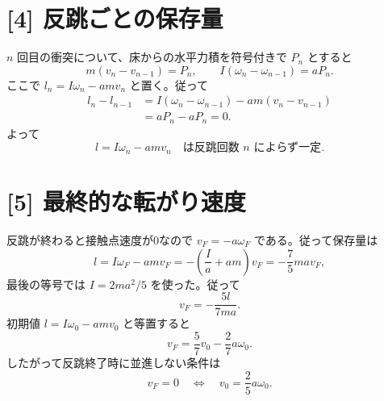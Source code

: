 \documentclass[11pt,a4paper]{article}
\begin{document}
\section*{[4] 反跳ごとの保存量}
$n$ 回目の衝突について、床からの水平力積を符号付きで $P_n$ とすると
\begin{equation}
 m(v_n-v_{n-1})=P_n,\qquad
 I(\omega_n-\omega_{n-1})=aP_n.
\end{equation}
ここで $l_n=I\omega_n-amv_n$ と置く。従って
\begin{align}
 l_n-l_{n-1}
 &=I(\omega_n-\omega_{n-1})-am(v_n-v_{n-1})\\
 &=aP_n-aP_n=0.
\end{align}
よって
\begin{equation}
 \boxed{l=I\omega_n-amv_n\quad\text{は反跳回数 }n\text{ によらず一定}.}
\end{equation}

\section*{[5] 最終的な転がり速度}
反跳が終わると接触点速度が0なので $v_F=-a\omega_F$ である。従って保存量は
\begin{equation}
 l=I\omega_F-amv_F
  =-\left(\frac{I}{a}+am\right)v_F
  =-\frac75ma v_F,
\end{equation}
最後の等号では $I=2ma^2/5$ を使った。従って
\begin{equation}
 \boxed{v_F=-\frac{5l}{7ma}}.
\end{equation}
初期値 $l=I\omega_0-amv_0$ と等置すると
\begin{equation}
 \boxed{v_F=\frac57v_0-\frac27a\omega_0}.
\end{equation}
したがって反跳終了時に並進しない条件は
\begin{equation}
 \boxed{v_F=0\quad\Longleftrightarrow\quad v_0=\frac25a\omega_0}.
\end{equation}
\end{document}
